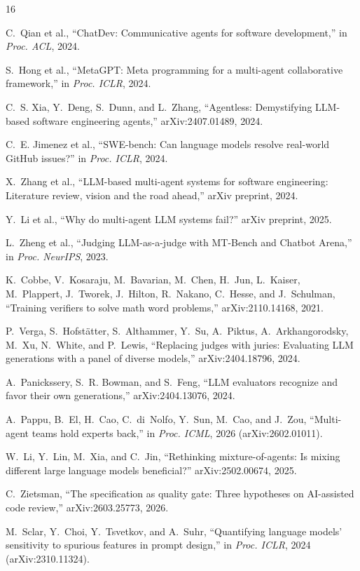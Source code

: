 \documentclass[conference]{IEEEtran}
\begin{document}
\begin{thebibliography}{16}

C.~Qian et al., ``ChatDev: Communicative agents for software development,''
in \emph{Proc. ACL}, 2024.

S.~Hong et al., ``MetaGPT: Meta programming for a multi-agent collaborative
framework,'' in \emph{Proc. ICLR}, 2024.

C.~S. Xia, Y.~Deng, S.~Dunn, and L.~Zhang, ``Agentless: Demystifying
LLM-based software engineering agents,'' arXiv:2407.01489, 2024.

C.~E. Jimenez et al., ``SWE-bench: Can language models resolve real-world
GitHub issues?'' in \emph{Proc. ICLR}, 2024.

X.~Zhang et al., ``LLM-based multi-agent systems for software engineering:
Literature review, vision and the road ahead,'' arXiv preprint, 2024.

Y.~Li et al., ``Why do multi-agent LLM systems fail?'' arXiv preprint, 2025.

L.~Zheng et al., ``Judging LLM-as-a-judge with MT-Bench and Chatbot Arena,''
in \emph{Proc. NeurIPS}, 2023.

K.~Cobbe, V.~Kosaraju, M.~Bavarian, M.~Chen, H.~Jun, L.~Kaiser, M.~Plappert,
J.~Tworek, J.~Hilton, R.~Nakano, C.~Hesse, and J.~Schulman, ``Training
verifiers to solve math word problems,'' arXiv:2110.14168, 2021.

P.~Verga, S.~Hofst\"atter, S.~Althammer, Y.~Su, A.~Piktus, A.~Arkhangorodsky,
M.~Xu, N.~White, and P.~Lewis, ``Replacing judges with juries: Evaluating LLM
generations with a panel of diverse models,'' arXiv:2404.18796, 2024.

A.~Panickssery, S.~R. Bowman, and S.~Feng, ``LLM evaluators recognize and
favor their own generations,'' arXiv:2404.13076, 2024.

A.~Pappu, B.~El, H.~Cao, C.~di~Nolfo, Y.~Sun, M.~Cao, and J.~Zou,
``Multi-agent teams hold experts back,'' in \emph{Proc. ICML}, 2026
(arXiv:2602.01011).

W.~Li, Y.~Lin, M.~Xia, and C.~Jin, ``Rethinking mixture-of-agents: Is
mixing different large language models beneficial?'' arXiv:2502.00674,
2025.

C.~Zietsman, ``The specification as quality gate: Three hypotheses on
AI-assisted code review,'' arXiv:2603.25773, 2026.

M.~Sclar, Y.~Choi, Y.~Tsvetkov, and A.~Suhr, ``Quantifying language models'
sensitivity to spurious features in prompt design,'' in \emph{Proc. ICLR},
2024 (arXiv:2310.11324).

\end{thebibliography}
\end{document}

